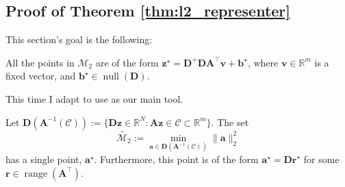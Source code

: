 \subsection{Proof of Theorem \ref{thm:l2_representer}}\label{ap:representer_l2}

This section's goal is the following:

\begin{claim}
    All the points in $\mathcal{M}_2$ are of the form $\mathbf{z}^\star = \mathbf{D}^+ \mathbf{DA}^\top \mathbf{v} + \mathbf{b}^\star$, where $\mathbf{v} \in \mathbb{R}^{m}$ is a fixed vector, and $\mathbf{b}^\star \in \operatorname{null} \left ( \mathbf{D} \right )$.
\end{claim}

This time I adapt \cite[Theorems 5, 9, 18]{unser2016} to use as our main tool.

\begin{lemma}\label{lem:l2_unique_solution}
    Let $\mathbf{D}(\mathbf{A}^{-1}(\mathcal{C})) := \{ \mathbf{Dz} \in \mathbb{R}^{N} : \mathbf{Az} \in \mathcal{C} \subset \mathbb{R}^{m} \}$. The set
    \begin{equation}
        \widetilde{\mathcal{M}_2} := \underset{\mathbf{a} \in \mathbf{D}(\mathbf{A}^{-1}(\mathcal{C}))}{\min} \| \mathbf{a} \|_2^2
    \end{equation}
    has a single point, $\mathbf{a}^\star$. Furthermore, this point is of the form $\mathbf{a}^\star = \mathbf{Dr}^\star$ for some $\mathbf{r} \in \operatorname{range} \left( \mathbf{A}^\top \right)$.
\end{lemma}

